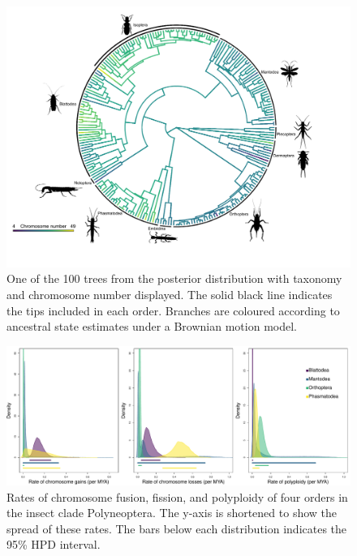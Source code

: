 \documentclass[]{rsos}%
\begin{document}
\newpage
\begin{figure}[h!]
\centering \includegraphics[width=1\textwidth]{phyloplot.pdf}
\caption{One of the 100 trees from the posterior distribution with taxonomy and chromosome number displayed. 
The solid black line indicates the tips included in each order. 
Branches are coloured according to ancestral state estimates under a Brownian motion model. }
\label{fig:phyloplot}
\end{figure}


\begin{figure}[h!]
\centering \includegraphics[width=1\textwidth]{order_rates_95HPD.pdf}
\caption{Rates of chromosome fusion, fission, and polyploidy of four orders in the insect clade Polyneoptera. 
The y-axis is shortened to show the spread of these rates. 
The bars below each distribution indicates the 95\% HPD interval.}
\label{fig:order.rates.95HPD}
\end{figure}
\end{document}
